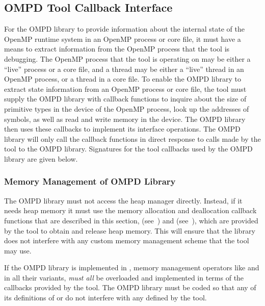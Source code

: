 \subsection{OMPD Tool Callback Interface}
\label{subsec:ompd-tool-callback-interface}

For the OMPD library to provide information about the internal state of the 
OpenMP runtime system in an OpenMP process or core file, it must have a means 
to extract information from the OpenMP process that the tool is debugging.
The OpenMP process that the tool is operating on may be either a ``live'' 
process or a core file, and a thread may be either a ``live'' thread in an 
OpenMP process, or a thread in a core file. To enable the OMPD library to 
extract state information from an OpenMP process or core file, the tool must 
supply the OMPD library with callback functions to inquire about the size of 
primitive types in the device of the OpenMP process, look up the addresses 
of symbols, as well as read and write memory in the device. The OMPD library 
then uses these callbacks to implement its interface operations. The OMPD 
library will only call the callback functions in direct response to calls 
made by the tool to the OMPD library. Signatures for the tool callbacks 
used by the OMPD library are given below.



\subsubsection{Memory Management of OMPD Library}
The OMPD library must not access the heap manager directly. Instead, if it needs heap memory it
must use the memory allocation and deallocation callback functions that are described in this
section,  (see~)
and 
 (see~),
which are
provided by the tool to obtain and release heap memory. This will ensure that the library does not
interfere with any custom memory management scheme that the tool may use.

If the OMPD library is implemented in , memory management operators like 
and  in all their variants, \emph{must all} be overloaded and implemented in terms of
the callbacks provided by the tool. The OMPD library must be coded so that any of its
definitions of  or  do not interfere with any defined by the tool.

